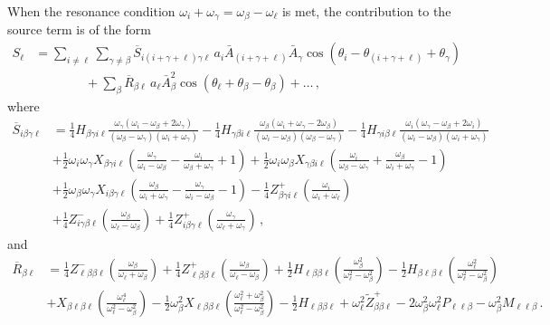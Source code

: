 \documentclass[letterpaper,11pt]{article}
\newcommand{\oi}{\omega_i}
\newcommand{\ol}{\omega_\ell}
\newcommand{\obet}{\omega_{\beta}}
\newcommand{\ogam}{\omega_\gamma}
\begin{document}
When the resonance condition $\oi + \ogam = \obet - \ol$ is met, the contribution to the source term is of the form
\begin{align}
\label{intpluschi1 source}
S_\ell &= \sum_{i \neq \ell} \sum_{\gamma \neq \beta} \overline{S}_{i (i + \gamma + \ell) \gamma \ell} \, a_i \bar A_{(i + \gamma + \ell)} \bar A_\gamma \cos \left( \theta_i - \theta_{(i + \gamma + \ell)} + \theta_\gamma \right) \nonumber \\
%
& \qquad \qquad + \sum_\beta \overline{R}_{\beta \ell} \, a_\ell \bar A_\beta^2  \cos \left(\theta_\ell + \theta_\beta - \theta_\beta \right) + \ldots \, ,
\end{align}
where 
\begin{align}
\overline{S}_{i \beta\gamma\ell} &= \frac{1}{4} H_{\beta\gamma i \ell} \frac{ \ogam (\oi - \obet + 2\ogam)}{(\obet - \ogam)(\oi + \ogam)} - \frac{1}{4} H_{\gamma\beta i \ell} \frac{\obet(\oi + \ogam - 2\obet)}{(\oi - \obet)(\obet - \ogam)} - \frac{1}{4} H_{\gamma i \beta\ell} \frac{\oi (\ogam - \obet + 2\oi)}{(\oi - \obet)(\oi + \ogam)} \nonumber \\
%
& + \frac{1}{2} \oi \ogam X_{\beta\gamma i \ell} \left( \frac{\ogam}{\oi - \obet} - \frac{\oi}{\obet + \ogam} + 1 \right) + \frac{1}{2} \oi \obet X_{\gamma\beta i \ell} \left( \frac{\oi}{\obet - \ogam} + \frac{\obet}{\oi + \ogam} - 1 \right) \nonumber \\
%
& + \frac{1}{2} \obet \ogam X_{i\beta\gamma\ell} \left(\frac{\obet}{\oi + \ogam} - \frac{\ogam}{\oi - \obet} - 1 \right) - \frac{1}{4} Z^+_{\beta\gamma i \ell} \left( \frac{\oi}{\oi + \ol}\right)  \nonumber \\
%
& + \frac{1}{4} Z^{-}_{i\gamma\beta\ell} \left(  \frac{\obet}{\ol - \obet}  \right) + \frac{1}{4} Z^+_{i\beta\gamma\ell} \left( \frac{\ogam}{\ol + \ogam} \right) \, ,
\end{align}
and
\begin{align}
\overline{R}_{\beta \ell} &= \frac{1}{4} Z^{-}_{\ell \beta \beta \ell} \left( \frac{\obet}{\ol + \obet} \right) +  \frac{1}{4} Z^+_{\ell \beta \beta \ell} \left(\frac{\obet}{\ol - \obet} \right) + \frac{1}{2} H_{\ell\beta\beta\ell} \left( \frac{\obet^2}{\ol^2 - \obet^2} \right) - \frac{1}{2} H_{\beta \ell\beta\ell} \left( \frac{\ol^2}{\ol^2 - \obet^2} \right) \nonumber \\
%
& + X_{\beta\ell\beta\ell} \left( \frac{\ol^4}{\ol^2 - \obet^2} \right)  - \frac{1}{2} \obet^2  X_{\ell\beta\beta\ell} \left(\frac{\ol^2 + \obet^2 }{\ol^2 - \obet^2} \right)  - \frac{1}{2} H_{\ell\beta\beta\ell} + \ol^2 \tilde{Z}^+_{\beta\beta\ell} -2 \obet^2 \ol^2 P_{\ell\ell\beta} - \obet^2 M_{\ell\ell\beta} \, .
\end{align}
\end{document}
